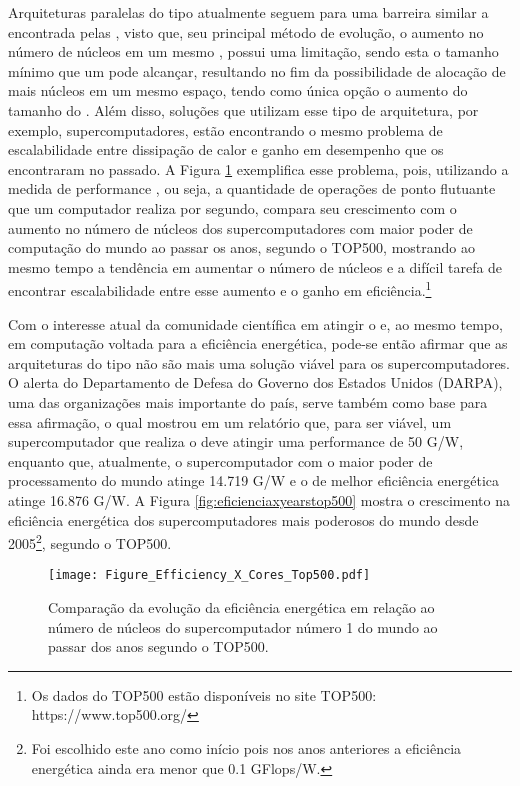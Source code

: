 Arquiteturas paralelas do tipo \multicore atualmente seguem para uma barreira similar a encontrada pelas \singlecore, visto que, seu principal método de evolução, o aumento no número de núcleos em um mesmo \chip, possui uma limitação, sendo esta o tamanho mínimo que um \transistor pode alcançar, resultando no fim da possibilidade de alocação de mais núcleos em um mesmo espaço, tendo como única opção o aumento do tamanho do \chip. Além disso, soluções que utilizam esse tipo de arquitetura, por exemplo, supercomputadores, estão encontrando o mesmo problema de escalabilidade entre dissipação de calor e ganho em desempenho que os \singlecore encontraram no passado. A Figura \ref{fig:eficienciaxcorestop500} exemplifica esse problema, pois, utilizando a medida de performance \Flops, ou seja, a quantidade de operações de ponto flutuante que um computador realiza por segundo, compara seu crescimento com o aumento no número de núcleos dos supercomputadores com maior poder de computação do mundo ao passar os anos, segundo o \ranking TOP500, mostrando ao mesmo tempo a tendência em aumentar o número de núcleos e a difícil tarefa de encontrar escalabilidade entre esse aumento e o ganho em eficiência.\footnote{Os dados do \ranking TOP500 estão disponíveis no site TOP500: https://www.top500.org/}

Com o interesse atual da comunidade científica em atingir o \exaescale e, ao mesmo tempo, em computação voltada para a eficiência energética, pode-se então afirmar que as arquiteturas do tipo \multicore não são mais uma solução viável para os supercomputadores. O alerta do Departamento de Defesa do Governo dos Estados Unidos (DARPA), uma das organizações mais importante do país, serve também como base para essa afirmação, o qual mostrou em um relatório \cite{darpa:exascale} que, para ser viável, um supercomputador que realiza o \exaescale deve atingir uma performance de 50 G\Flops/W, enquanto que, atualmente, o supercomputador com o maior poder de processamento do mundo atinge 14.719 G\Flops/W e o de melhor eficiência energética atinge 16.876 G\Flops/W. A Figura \ref{fig:eficienciaxyearstop500} mostra o crescimento na eficiência energética dos supercomputadores mais poderosos do mundo desde 2005\footnote{Foi escolhido este ano como início pois nos anos anteriores a eficiência energética ainda era menor que 0.1 GFlops/W.}, segundo o \ranking TOP500.

\begin{figure}[tb]
  \centering
  \caption{Comparação da evolução da eficiência energética em relação ao número de núcleos do supercomputador número 1 do mundo ao passar dos anos segundo o \ranking TOP500.}
  \label{fig:eficienciaxcorestop500}
  \texttt{[image: Figure\_Efficiency\_X\_Cores\_Top500.pdf]}
\end{figure}

